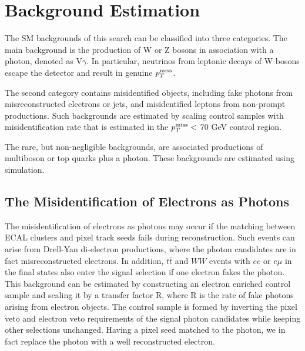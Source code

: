 \documentclass[thesis.tex]{subfiles}
\renewcommand\_{\textunderscore\allowbreak}
\begin{document}
\chapter{Background Estimation}
\label{ch6}

The SM backgrounds of this search can be classified into three categories. 
The main background is the production of W or Z bosons in association with a photon, 
denoted as V$\gamma$. In particular, neutrinos from leptonic decays of W bosons escape the detector and result in genuine $p_T^\textrm{miss}$.

The second category contains misidentified objects, including fake photons from misreconstructed electrons or jets, 
and misidentified leptons from non-prompt productions. Such backgrounds are estimated by scaling control samples with 
misidentification rate that is estimated in the $p_T^\textrm{miss} <$ 70 GeV control region. 

The rare, but non-negligible backgrounds, are associated productions of multiboson or top quarks plus a photon. 
These backgrounds are estimated using simulation. 

\section{The Misidentification of Electrons as Photons}
\label{sec:efakepho}

The misidentification of electrons as photons may occur if the matching between ECAL clusters and pixel track seeds fails during reconstruction. Such events can arise from Drell-Yan di-electron productions, where the photon candidates are in fact misreconstructed electrons. In addition, $t\bar{t}$ and $WW$ events with  $ee$ or $e\mu$ in the final states also enter the signal selection if one electron fakes the photon. This background can be estimated by constructing an electron enriched control sample and scaling it by a transfer factor R, where R is the rate of fake photons arising from electron objects. The control sample is formed by inverting the pixel veto and electron veto requirements of the signal photon candidates while keeping other selections unchanged. Having a pixel seed matched to the photon, we in fact replace the photon with a well reconstructed electron.
\end{document}
